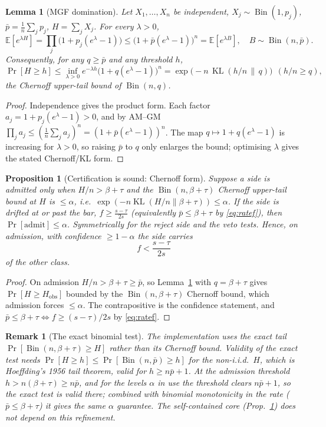\documentclass[11pt]{article}
\newtheorem{lemma}{Lemma}
\newtheorem{proposition}{Proposition}
\newtheorem{remark}{Remark}
\DeclareMathOperator{\Bin}{Bin}
\DeclareMathOperator{\KL}{KL}
\begin{document}
\begin{lemma}[MGF domination]\label{lem:mgf}
Let $X_1,\dots,X_n$ be independent, $X_j\sim\Bin(1,p_j)$, $\bar p=\frac1n\sum_j p_j$,
$H=\sum_j X_j$. For every $\lambda>0$,
\[
  \mathbb E[e^{\lambda H}]=\prod_{j}\big(1+p_j(e^\lambda-1)\big)\le\big(1+\bar p(e^\lambda-1)\big)^n=\mathbb E[e^{\lambda B}],\quad B\sim\Bin(n,\bar p).
\]
Consequently, for any $q\ge\bar p$ and any threshold $h$,
\[
  \Pr[H\ge h]\le\inf_{\lambda>0}e^{-\lambda h}\big(1+q(e^\lambda-1)\big)^n
  = \exp\!\big(-n\,\KL(h/n\,\|\,q)\big)\ \ (h/n\ge q),
\]
the Chernoff upper-tail bound of $\Bin(n,q)$.
\end{lemma}
\begin{proof}
Independence gives the product form. Each factor $a_j=1+p_j(e^\lambda-1)>0$, and by
AM--GM $\prod_j a_j\le(\frac1n\sum_j a_j)^n=(1+\bar p(e^\lambda-1))^n$. The map
$q\mapsto 1+q(e^\lambda-1)$ is increasing for $\lambda>0$, so raising $\bar p$ to
$q$ only enlarges the bound; optimising $\lambda$ gives the stated Chernoff/KL form.
\end{proof}

\begin{proposition}[Certification is sound: Chernoff form]\label{prop:cert}
Suppose a side is admitted only when $H/n>\beta+\tau$ and the $\Bin(n,\beta+\tau)$
Chernoff upper-tail bound at $H$ is $\le\alpha$, i.e.\
$\exp(-n\KL(H/n\|\beta+\tau))\le\alpha$. If the side is drifted at or past the bar,
$f\ge\frac{s-\tau}{2s}$ (equivalently $\bar p\le\beta+\tau$ by \eqref{eq:ratef}),
then $\Pr[\text{admit}]\le\alpha$. Symmetrically for the reject side and the veto
tests. Hence, on admission, with confidence $\ge1-\alpha$ the side carries
\[
  f<\frac{s-\tau}{2s}
\]
of the other class.
\end{proposition}
\begin{proof}
On admission $H/n>\beta+\tau\ge\bar p$, so Lemma~\ref{lem:mgf} with $q=\beta+\tau$
gives $\Pr[H\ge H_{\mathrm{obs}}]$ bounded by the $\Bin(n,\beta+\tau)$ Chernoff
bound, which admission forces $\le\alpha$. The contrapositive is the confidence
statement, and $\bar p\le\beta+\tau\iff f\ge(s-\tau)/2s$ by \eqref{eq:ratef}.
\end{proof}

\begin{remark}[The exact binomial test]\label{rem:exact}
The implementation uses the exact tail $\Pr[\Bin(n,\beta+\tau)\ge H]$ rather than
its Chernoff bound. Validity of the exact test needs
$\Pr[H\ge h]\le\Pr[\Bin(n,\bar p)\ge h]$ for the non-i.i.d.\ $H$, which is
Hoeffding's 1956 tail theorem, valid for $h\ge n\bar p+1$. At the admission
threshold $h>n(\beta+\tau)\ge n\bar p$, and for the levels $\alpha$ in use the
threshold clears $n\bar p+1$, so the exact test is valid there; combined with
binomial monotonicity in the rate ($\bar p\le\beta+\tau$) it gives the same
$\alpha$ guarantee. The self-contained core (Prop.~\ref{prop:cert}) does not
depend on this refinement.
\end{remark}
\end{document}
